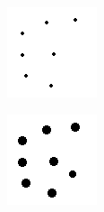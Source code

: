 \begin{minipage}{0.5\linewidth}
	\centering
	\includegraphics[width=0.9\linewidth]{./Experiments/BProp/fig/Input.png} 
	\label{fig:input-BP}
\end{minipage}
\begin{minipage}{0.5\linewidth}
	\centering
	\includegraphics[width=0.9\linewidth]{./Experiments/BProp/fig/Output.png}
	\label{fig:output-BP}
\end{minipage}
